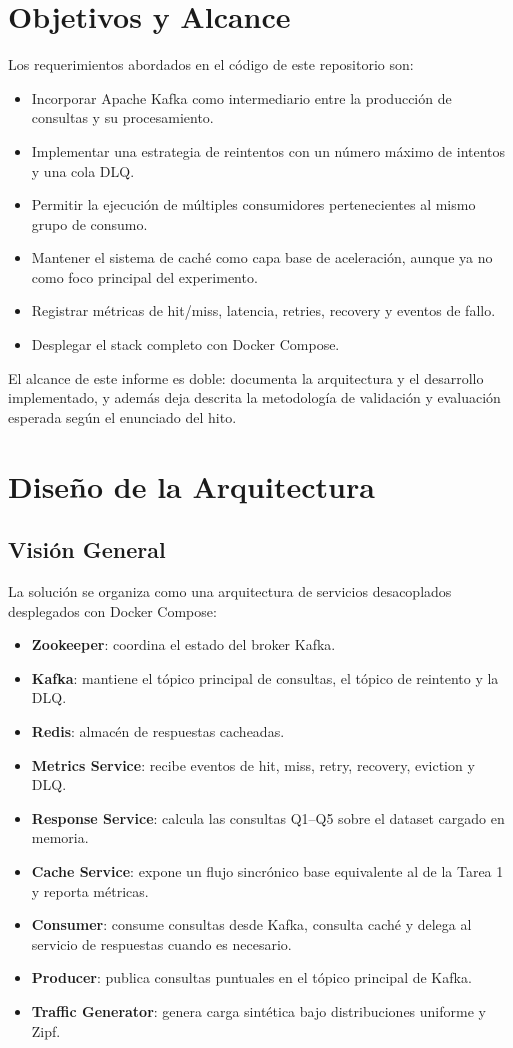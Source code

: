 \documentclass[letter,12pt]{article}
\begin{document}
\section{Objetivos y Alcance}
Los requerimientos abordados en el c\'odigo de este repositorio son:
\begin{itemize}
    \item Incorporar Apache Kafka como intermediario entre la producci\'on de consultas y su procesamiento.
    \item Implementar una estrategia de reintentos con un n\'umero m\'aximo de intentos y una cola DLQ.
    \item Permitir la ejecuci\'on de m\'ultiples consumidores pertenecientes al mismo grupo de consumo.
    \item Mantener el sistema de cach\'e como capa base de aceleraci\'on, aunque ya no como foco principal del experimento.
    \item Registrar m\'etricas de hit/miss, latencia, retries, recovery y eventos de fallo.
    \item Desplegar el stack completo con Docker Compose.
\end{itemize}

El alcance de este informe es doble: documenta la arquitectura y el desarrollo implementado, y adem\'as deja descrita la metodolog\'ia de validaci\'on y evaluaci\'on esperada seg\'un el enunciado del hito.

\section{Dise\~no de la Arquitectura}
\subsection{Visi\'on General}
La soluci\'on se organiza como una arquitectura de servicios desacoplados desplegados con Docker Compose:
\begin{itemize}
    \item \textbf{Zookeeper}: coordina el estado del broker Kafka.
    \item \textbf{Kafka}: mantiene el t\'opico principal de consultas, el t\'opico de reintento y la DLQ.
    \item \textbf{Redis}: almac\'en de respuestas cacheadas.
    \item \textbf{Metrics Service}: recibe eventos de hit, miss, retry, recovery, eviction y DLQ.
    \item \textbf{Response Service}: calcula las consultas Q1--Q5 sobre el dataset cargado en memoria.
    \item \textbf{Cache Service}: expone un flujo sincr\'onico base equivalente al de la Tarea 1 y reporta m\'etricas.
    \item \textbf{Consumer}: consume consultas desde Kafka, consulta cach\'e y delega al servicio de respuestas cuando es necesario.
    \item \textbf{Producer}: publica consultas puntuales en el t\'opico principal de Kafka.
    \item \textbf{Traffic Generator}: genera carga sint\'etica bajo distribuciones uniforme y Zipf.
\end{itemize}
\end{document}
